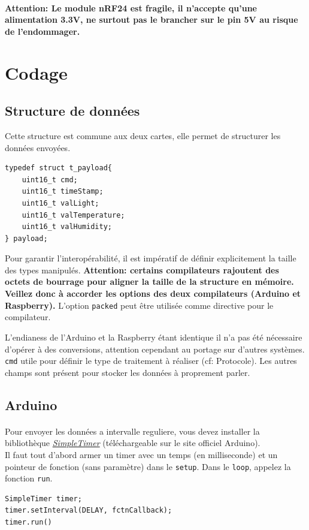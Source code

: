 \documentclass[a4paper, titlepage, oneside, 12pt]{article}%
\begin{document}
\paragraph{}
\textbf{Attention: Le module nRF24 est fragile, il n'accepte qu'une alimentation 3.3V, ne surtout pas le brancher sur le pin 5V au risque de l'endommager.}

\section{Codage}
\subsection{Structure de données}
Cette structure est commune aux deux cartes, elle permet de structurer les données envoyées.
\begin{lstlisting}
typedef struct t_payload{
	uint16_t cmd;
	uint16_t timeStamp;
	uint16_t valLight;
	uint16_t valTemperature;
	uint16_t valHumidity;
} payload;
\end{lstlisting}
Pour garantir l’interopérabilité, il est impératif de définir explicitement la taille des types manipulés.
\textbf{Attention: certains compilateurs rajoutent des octets de bourrage pour aligner la taille de la structure en mémoire. Veillez donc à accorder les options des deux compilateurs (Arduino et Raspberry).}
L'option \texttt{packed} peut être utilisée comme directive pour le compilateur.
  
L'endianess de l'Arduino et la Raspberry étant identique il n'a pas été nécessaire d'opérer à des conversions, attention cependant au portage sur d'autres systèmes.
\texttt{cmd} utile pour définir le type de traitement à réaliser (cf: Protocole).
Les autres champs sont présent pour stocker les données à proprement parler.
\subsection{Arduino}
\paragraph{}
Pour envoyer les données a intervalle reguliere, vous devez installer la bibliothèque \href{http://playground.arduino.cc/Code/SimpleTimer?ref=driverlayer.com/web}{\textit{SimpleTimer}} (téléchargeable sur le site officiel Arduino).\\
Il faut tout d'abord armer un timer avec un temps (en milliseconde) et un pointeur de fonction (sans paramètre) dans le \texttt{setup}. Dans le \texttt{loop}, appelez la fonction \texttt{run}.\\
\begin{lstlisting}
SimpleTimer timer;
timer.setInterval(DELAY, fctnCallback);
timer.run()
\end{lstlisting}
\end{document}
